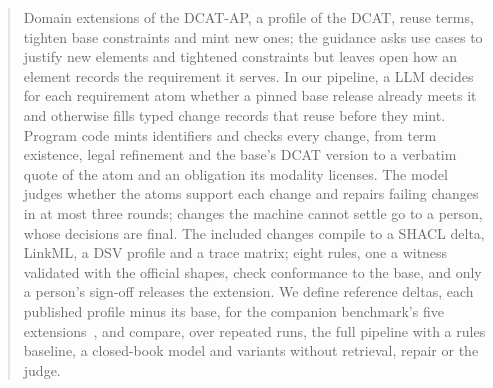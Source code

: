 \begin{abstract}
Domain extensions of the \ac{DCAT-AP}, a profile of the \ac{DCAT}, reuse terms, tighten base constraints and mint
new ones; the guidance asks use cases to justify new elements and tightened constraints but leaves open how an
element records the requirement it serves.
In our pipeline, a \ac{LLM} decides for each requirement atom whether a pinned base release already meets it and
otherwise fills typed change records that reuse before they mint. %
Program code mints identifiers and checks every change, from term existence, legal refinement and the base's
DCAT version to a verbatim quote of the atom and an obligation its modality licenses. %
The model judges whether the atoms support each change and repairs failing changes in at most three rounds; %
changes the machine cannot settle go to a person, whose decisions are final.
The included changes compile to a \ac{SHACL} delta, \ac{LinkML}, a \ac{DSV} profile and a trace matrix; eight
rules, one a witness validated with the official shapes, check conformance to the base, and only a person's %
sign-off releases the extension.
We define reference deltas, each published profile minus its base, for the companion benchmark's five %
extensions~\cite{anon2027rq1}, and compare, over repeated runs, the full pipeline with a rules baseline, a
closed-book model and variants without retrieval, repair or the judge.
\end{abstract}
